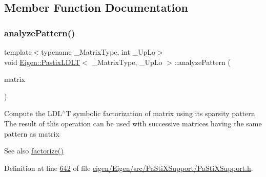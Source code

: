 \subsection{Member Function Documentation}
\mbox{\label{class_eigen_1_1_pastix_l_d_l_t_a01947862303ca404b9ce5033751a221b}} 
\subsubsection{\texorpdfstring{analyze\+Pattern()}{analyzePattern()}\hspace{0.1cm}{\footnotesize\ttfamily [1/2]}}
{\footnotesize\ttfamily template$<$typename \+\_\+\+Matrix\+Type, int \+\_\+\+Up\+Lo$>$ \\
void \hyperlink{class_eigen_1_1_pastix_l_d_l_t}{Eigen\+::\+Pastix\+L\+D\+LT}$<$ \+\_\+\+Matrix\+Type, \+\_\+\+Up\+Lo $>$\+::analyze\+Pattern (\begin{DoxyParamCaption}\item[{const Matrix\+Type \&}]{matrix }\end{DoxyParamCaption})\hspace{0.3cm}{\ttfamily [inline]}}

Compute the L\+D\+L$^\wedge$T symbolic factorization of {\ttfamily matrix} using its sparsity pattern The result of this operation can be used with successive matrices having the same pattern as {\ttfamily matrix} \begin{DoxySeeAlso}{See also}
\hyperlink{class_eigen_1_1_pastix_l_d_l_t_a182b0ee676a131413363cc73bc309ef7}{factorize()} 
\end{DoxySeeAlso}


Definition at line \hyperlink{eigen_2_eigen_2src_2_pa_sti_x_support_2_pa_sti_x_support_8h_source_l00642}{642} of file \hyperlink{eigen_2_eigen_2src_2_pa_sti_x_support_2_pa_sti_x_support_8h_source}{eigen/\+Eigen/src/\+Pa\+Sti\+X\+Support/\+Pa\+Sti\+X\+Support.\+h}.

\mbox{\label{class_eigen_1_1_pastix_l_d_l_t_a01947862303ca404b9ce5033751a221b}} 
